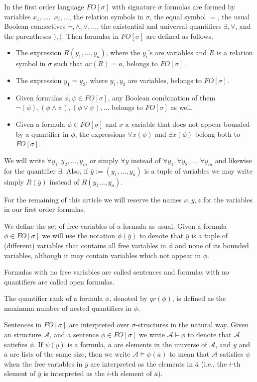 \documentclass[12pt,notitlepage,a4paper]{article}
\theoremstyle{definition}
\begin{document}
In the first order language $FO[\sigma]$ with signature $\sigma$ 
formulas are formed by variables $x_1,\dots,$ $x_i,\dots$,
the relation symbols in $\sigma$, the equal symbol $=$,
the usual Boolean connectives $\neg, \wedge, \vee, \dots$, 
the existential and universal quantifiers $\exists, \forall$, and
the parentheses $),($. Then formulas in $FO[\sigma]$ are defined as 
follows.
\vspace*{-0.2em}
\begin{itemize}[topsep=1pt, itemsep=1pt]
	\item The expression $R(y_1,\dots,y_a)$, where the $y_i$'s are variables and $R$
	is a relation symbol in $\sigma$ such that $ar(R)=a$,
	belongs to $FO[\sigma]$.
	\item The expression $y_1=y_2$, where $y_1, y_2$ are variables, 
	belongs to $FO[\sigma]$.
	\item Given formulas $\phi, \psi \in FO[\sigma]$, any Boolean combination of them
	$\neg(\phi), (\phi \wedge \psi), (\phi \vee \psi), \dots$ belongs to $FO[\sigma]$ as well.
	\item Given a formula $\phi \in FO[\sigma]$ and $x$ a variable that 
	does not appear bounded
	by a quantifier in $\phi$, the expressions $\forall x (\phi)$ and 
	$\exists x (\phi)$ belong both to $FO[\sigma]$. 
\end{itemize}  
We will write $\forall y_1, y_2,\dots, y_m$ or simply $\forall \overline{y}$
instead of  
$\forall y_1, \forall y_2,\dots, \forall y_m$ and likewise for
the quantifier $\exists$. Also, if $\overline{y}:=(y_1,\dots,y_a)$ is a
tuple of variables we may write simply $R(\overline{y})$ instead
of $R(y_1\dots,y_a)$.\par
For the remaining of this article we will reserve the names $x,y,z$
for the variables in our first order formulas.\par
We define the set of free variables of a formula as usual. 
Given a formula $\phi\in FO[\sigma]$ we will use the notation $\phi(\overline{y})$ 
to denote that $\overline{y}$ is a tuple of 
(different) variables that contains all free variables in $\phi$ and
none of its bounded variables, although it may contain variables
which not appear in $\phi$. \par
Formulas with no free variables are called sentences and 
formulas with no quantifiers are called open formulas. \par
The quantifier rank of a formula $\phi$, denoted by $qr(\phi)$, 
is defined as the maximum number of nested quantifiers in $\phi$. \par
Sentences in $FO[\sigma]$ are interpreted over $\sigma$-structures
in the natural way. Given an structure $\mathcal{A}$, and a sentence
$\phi\in FO[\sigma]$ we write $\mathcal{A} \models \phi$ to denote 
that $\mathcal{A}$ satisfies $\phi$. If $\psi(\overline{y})$ is a
formula, $\overline{a}$ are elements in the universe of 
$\mathcal{A}$, and $\overline{y}$ and $\overline{a}$ are lists of the same size,
then we write $\mathcal{A} \models 
\psi(\overline{a})$
to mean that $\mathcal{A}$ satisfies $\psi$ when the free variables in
$\overline{y}$ are interpreted as the elements in $\overline{a}$ (i.e., 
the $i$-th element of $\overline{y}$ is interpreted as the $i$-th
element of $\overline{a}$).
\end{document}
